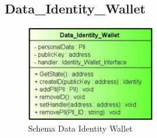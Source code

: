 \subsection{Data\_Identity\_Wallet}
\begin{figure}[h]
	\centering
	\includegraphics[width=0.5\textwidth]{immagini/identitywalletdata}
	\caption{Schema Data Identity Wallet}
\end{figure}
